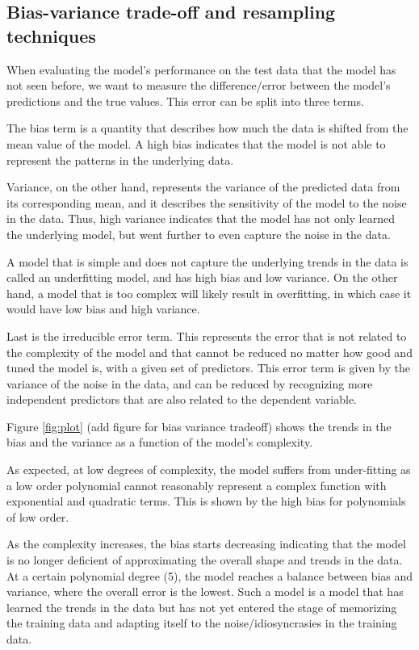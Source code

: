 \documentclass{article}
\begin{document}
\subsection{Bias-variance trade-off and resampling techniques}
When evaluating the model’s performance on the test data that the model has not seen before, we want to measure the difference/error between the model’s predictions and the true values. This error can be split into three terms.

The bias term is a quantity that describes how much the data is shifted from the mean value of the model. A high bias indicates that the model is not able to represent the patterns in the underlying data.

Variance, on the other hand, represents the variance of the predicted data from its corresponding mean, and it describes the sensitivity of the model to the noise in the data. Thus, high variance indicates that the model has not only learned the underlying model, but went further to even capture the noise in the data.

A model that is simple and does not capture the underlying trends in the data is called an underfitting model, and has high bias and low variance. On the other hand, a model that is too complex will likely result in overfitting, in which case it would have low bias and high variance.

Last is the irreducible error term. This represents the error that is not related to the complexity of the model and that cannot be reduced no matter how good and tuned the model is, with a given set of predictors. This error term is given by the variance of the noise in the data, and can be reduced by recognizing more independent predictors that are also related to the dependent variable.

Figure \ref{fig:plot} (add figure for bias variance tradeoff) shows the trends in the bias and the variance as a function of the model’s complexity. 

As expected, at low degrees of complexity, the model suffers from under-fitting as a low order polynomial cannot reasonably represent a complex function with exponential and quadratic terms. This is shown by the high bias for polynomials of low order.

As the complexity increases, the bias starts decreasing indicating that the model is no longer deficient of approximating the overall shape and trends in the data. At a certain polynomial degree (5), the model reaches a balance between bias and variance, where the overall error is the lowest. Such a model is a model that has learned the trends in the data but has not yet entered the stage of memorizing the training data and adapting itself to the noise/idiosyncrasies in the training data.
\end{document}
